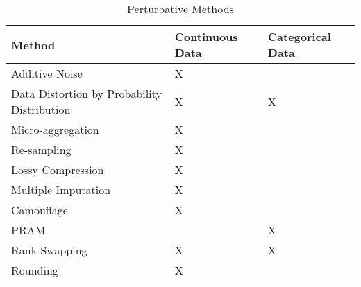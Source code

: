 \begin{table}[H]
\centering
\caption{Perturbative Methods}
\label{my-label}
\begin{tabular}{|l|l|l|}
\hline
Method                                      & Continuous Data & Categorical Data \\ \hline
Additive Noise                              & X               &                  \\ \hline
Data Distortion by Probability Distribution & X               & X                \\ \hline
Micro-aggregation                            & X               &                  \\ \hline
Re-sampling                                  & X               &                  \\ \hline
Lossy Compression                           & X               &                  \\ \hline
Multiple Imputation                         & X               &                  \\ \hline
Camouflage                                  & X               &                  \\ \hline
PRAM                                        &                 & X                \\ \hline
Rank Swapping                               & X               & X                \\ \hline
Rounding                                    & X               &                  \\ \hline
\end{tabular}
\end{table}
